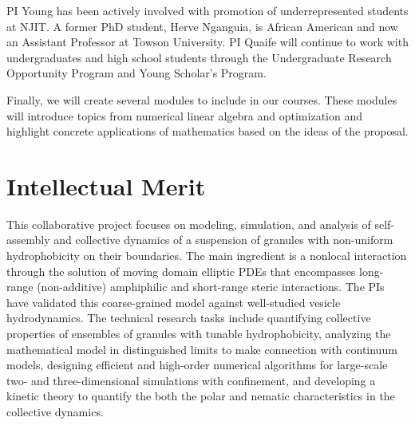 PI Young has been actively involved with promotion of
underrepresented students at NJIT.  A former PhD student, Herve Nganguia, is African American and 
now an Assistant Professor at Towson University. 
PI Quaife will continue to work with undergraduates and high school
students through the Undergraduate Research Opportunity Program and
Young Scholar's Program.

Finally, we will
create several modules to include in our courses. These modules will
introduce topics from numerical linear algebra and optimization and
highlight concrete applications of mathematics based on the ideas of the
proposal.

\section{Intellectual Merit}
\label{sec:IntellectualMerit}
This collaborative project focuses on modeling, simulation, and analysis
of self-assembly and collective dynamics of a suspension of granules with 
non-uniform hydrophobicity on their boundaries. The main
ingredient is a nonlocal interaction through the solution of moving
domain elliptic PDEs that encompasses long-range (non-additive) amphiphilic and
short-range steric interactions. The PIs have validated this
coarse-grained model against well-studied vesicle hydrodynamics. The
technical research tasks include quantifying collective properties of
ensembles of granules with tunable hydrophobicity, analyzing the mathematical model in 
distinguished limits to make connection with continuum models,
designing efficient and
high-order numerical algorithms for large-scale two- and
three-dimensional simulations with confinement, and developing a kinetic
theory to quantify the both the polar and nematic characteristics in the collective dynamics.
%


